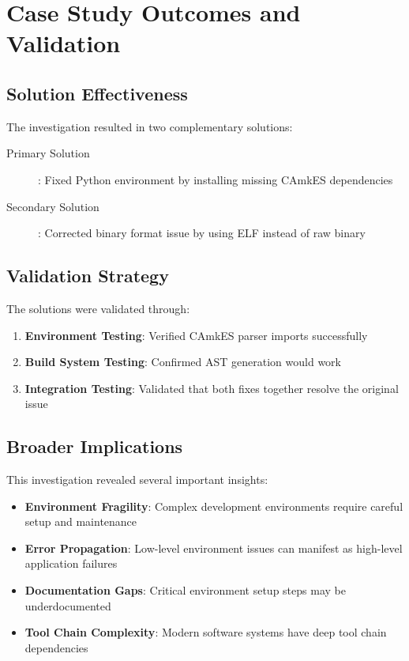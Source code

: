 \documentclass[11pt,a4paper]{article}
\begin{document}
\section{Case Study Outcomes and Validation}

\subsection{Solution Effectiveness}

The investigation resulted in two complementary solutions:

\begin{description}
\item[Primary Solution]: Fixed Python environment by installing missing CAmkES dependencies
\item[Secondary Solution]: Corrected binary format issue by using ELF instead of raw binary
\end{description}

\subsection{Validation Strategy}

The solutions were validated through:

\begin{enumerate}
\item \textbf{Environment Testing}: Verified CAmkES parser imports successfully
\item \textbf{Build System Testing}: Confirmed AST generation would work
\item \textbf{Integration Testing}: Validated that both fixes together resolve the original issue
\end{enumerate}

\subsection{Broader Implications}

This investigation revealed several important insights:

\begin{itemize}
\item \textbf{Environment Fragility}: Complex development environments require careful setup and maintenance
\item \textbf{Error Propagation}: Low-level environment issues can manifest as high-level application failures
\item \textbf{Documentation Gaps}: Critical environment setup steps may be underdocumented
\item \textbf{Tool Chain Complexity}: Modern software systems have deep tool chain dependencies
\end{itemize}
\end{document}
